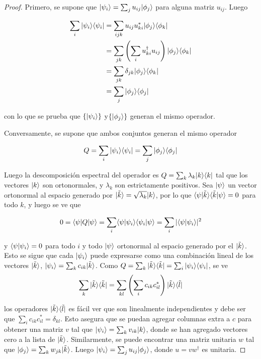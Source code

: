 \begin{proof}
	
	Primero, se supone que $|\psi_i\rangle= \sum_{j}u_{ij}|\phi_j\rangle$ para alguna matriz $u_{ij}$. Luego
	
	
	\begin{equation*}
		\begin{split}
			\sum_{i}|\psi_i\rangle \langle \psi_i|&=\sum_{ijk}u_{ij}u_{ki}^*|\phi_j\rangle \langle \phi_k|\\
			&=\sum_{jk}\left(\sum_i u_{ki}^\dagger u_{ij}\right) |\phi_j\rangle \langle \phi_k|\\
			&=\sum_{jk}\delta_{jk}|\phi_j\rangle \langle \phi_k|\\
			&=\sum_{j} |\phi_j\rangle \langle \phi_j|\\
	\end{split}
	\end{equation*}
	
	con lo que se prueba que $\{|\psi_i\rangle\}$ y$ \{|\phi_j\rangle \}$ generan el mismo operador.
	
	
	
	Conversamente, se supone que ambos conjuntos generan el mismo operador
	
	\[Q=\sum_{i}|\psi_i\rangle \langle \psi_i|=\sum_{j} |\phi_j\rangle \langle \phi_j|\]
	
	Luego la  descomposición espectral del operador es $Q = \sum_k \lambda_k |k \rangle \langle k|$ tal que los vectores $ |k\rangle$ son ortonormales, y $\lambda_k$ son estrictamente  positivos. Sea $|\psi\rangle$  un vector ortonormal al espacio generado por $|\tilde{k}\rangle=\sqrt{\lambda_k}|k\rangle$, por lo que $\langle \psi|\tilde{k}\rangle \langle \tilde{k}|\psi\rangle=0$ para todo $ k$, y luego se ve que
	
	\[0=\langle \psi |Q|\psi\rangle=\sum_{i}\langle\psi|\psi_i\rangle \langle \psi_i|\psi \rangle =\sum_i |\langle\psi|\psi_i\rangle|^2 \]
	
	y $\langle\psi|\psi_i\rangle=0$ para todo $i$ y todo $|\psi \rangle$ ortonormal al espacio generado  por el $|\tilde{k}\rangle$. Esto se sigue que cada $|\psi_i\rangle $ puede expresarse como una combinación lineal de los vectores  $|\tilde{k}\rangle$, $|\psi_i\rangle=\sum_k c_{ik} |\tilde{k}\rangle$. Como  $Q=\sum_k  |\tilde{k}\rangle \langle \tilde{k}|=\sum_{i}|\psi_i\rangle \langle\psi_i|$, se ve
	\[\sum_k |\tilde{k}\rangle \langle \tilde{k}|=\sum_{kl} \left(\sum_i c_{ik}c_{il}^{*}\right)|\tilde{k}\rangle \langle \tilde{l}|\]
	
	los operadores $|\tilde{k} \rangle \langle \tilde{l}|$ es fácil ver  que son linealmente independientes y debe ser que $\sum_i c_{ik}c_{il}^{*}=\delta_{kl}$. Esto asegura que se puedan agregar columnas extra a $c$ para obtener una matriz $v$ tal que $|\psi_i\rangle=\sum_{k}v_{ik}|k\rangle  $, donde se han agregado  vectores cero a la lista de $|\tilde{k}\rangle$. Similarmente, se puede encontrar una matriz unitaria $w$ tal que $|\phi_j\rangle=\sum_{k}w_{jk}|\tilde{k}\rangle$. Luego $|\psi_i\rangle=\sum_j u_{ij}|\phi_j\rangle$, donde  $u=vw^\dagger$ es unitaria. 
	\end{proof}

